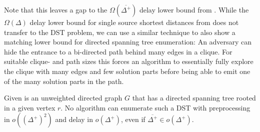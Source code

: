 \documentclass[a4paper, USenglish, cleveref, autoref, thm-restate]{lipics-v2021}
\newcommand{\maxdeg}{\Delta}
\newcommand{\maxoutdeg}{\Delta^+}
\newcommand{\avgoutdeg}{\overline{\Delta^+}}
\begin{document}
Note that this leaves a gap to the $\Omega(\avgoutdeg)$ delay lower bound from .
While the $\Omega(\maxdeg)$ delay lower bound for single source shortest distances from \cite{caselShortestDistancesEnumeration2024} does not transfer to the DST problem, we can use a similar technique to also show a matching lower bound for directed spanning tree enumeration:
An adversary can hide the entrance to a bi-directed path behind many edges in a clique.
For suitable clique- and path sizes this forces an algorithm to essentially fully explore the clique with many edges and few solution parts before being able to emit one of the many solution parts in the path.

\begin{theorem}
	\label{thm:dste-with-r-lower}
	Given is an unweighted directed graph $G$ that has a directed spanning tree rooted in a given vertex $r$.
	No algorithm can enumerate such a DST with preprocessing in $o((\maxoutdeg)^2)$ and delay in $o(\maxoutdeg)$, even if $\avgoutdeg \in o(\maxoutdeg)$.
\end{theorem}
\end{document}
